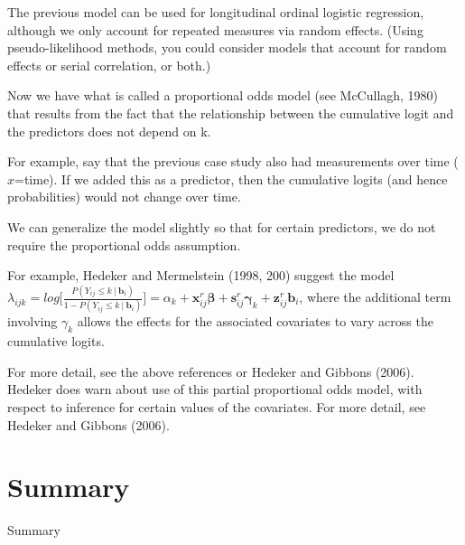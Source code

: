 \documentclass[
  9pt,
  ignorenonframetext,
]{beamer}
\begin{document}
\begin{frame}{}
\protect\hypertarget{section-5}{}
The previous model can be used for longitudinal ordinal logistic
regression, although we only account for repeated measures via random
effects. (Using pseudo-likelihood methods, you could consider models
that account for random effects or serial correlation, or both.)

Now we have what is called a proportional odds model (see McCullagh,
1980) that results from the fact that the relationship between the
cumulative logit and the predictors does not depend on k.

For example, say that the previous case study also had measurements over
time (\(x\)=time). If we added this as a predictor, then the cumulative
logits (and hence probabilities) would not change over time.
\end{frame}

\begin{frame}{}
\protect\hypertarget{section-6}{}
We can generalize the model slightly so that for certain predictors, we
do not require the proportional odds assumption.

For example, Hedeker and Mermelstein (1998, 200) suggest the model
\(\lambda_{ijk}=log \Big[\frac {P(Y_{ij} \leq k\ |\ \pmb b_i)} {1-P(Y_{ij}\leq k\ |\ \pmb b_i)} \Big]= \alpha_k + \pmb x_{ij}^r \pmb \beta + \pmb s_{ij}^r \pmb \gamma_k + \pmb z_{ij}^r \pmb b_i\),
where the additional term involving \(\gamma_k\) allows the effects for
the associated covariates to vary across the cumulative logits.

For more detail, see the above references or Hedeker and Gibbons (2006).
Hedeker does warn about use of this partial proportional odds model,
with respect to inference for certain values of the covariates. For more
detail, see Hedeker and Gibbons (2006).
\end{frame}

\hypertarget{summary}{%
\section{Summary}\label{summary}}

\begin{frame}{Summary}
\protect\hypertarget{summary-1}{}
\end{frame}
\end{document}
